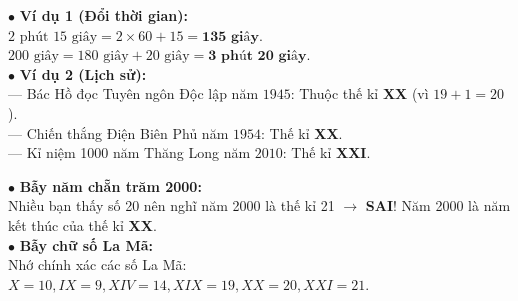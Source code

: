 \documentclass[14pt,a4paper,oneside]{extbook}
\begin{document}
\vspace{2mm}

\noindent
\begin{minipage}[t]{0.53\textwidth}
  \begin{tcolorbox}[
    enhanced,
    title={\footnotesize\bfseries\color{white}\faCheckCircle\ Ví dụ thực hành chuẩn mực},
    colback=green!2!white,
    colframe=green!60!black,
    arc=2.5mm, boxrule=0.8pt, top=1.8mm, bottom=1.8mm, left=2.2mm, right=2.2mm
  ]
    \footnotesize
    $\bullet$ \textbf{Ví dụ 1 (Đổi thời gian):}\\
    $2\text{ phút } 15\text{ giây} = 2 \times 60 + 15 = \mathbf{135\text{ giây}}$.\\
    $200\text{ giây} = 180\text{ giây} + 20\text{ giây} = \mathbf{3\text{ phút } 20\text{ giây}}$.\\
    $\bullet$ \textbf{Ví dụ 2 (Lịch sử):}\\
    --- Bác Hồ đọc Tuyên ngôn Độc lập năm $1945$: Thuộc thế kỉ \textbf{XX} (vì $19 + 1 = 20$).\\
    --- Chiến thắng Điện Biên Phủ năm $1954$: Thế kỉ \textbf{XX}.\\
    --- Kỉ niệm 1000 năm Thăng Long năm $2010$: Thế kỉ \textbf{XXI}.
  \end{tcolorbox}
\end{minipage}%
\hfill
\begin{minipage}[t]{0.45\textwidth}
  \begin{tcolorbox}[
    enhanced,
    title={\footnotesize\bfseries\color{white}\faExclamationTriangle\ Mẹo tránh bẫy trắc nghiệm},
    colback=red!2!white,
    colframe=red!70!black,
    arc=2.5mm, boxrule=0.8pt, top=1.8mm, bottom=1.8mm, left=2.2mm, right=2.2mm
  ]
    \footnotesize
    $\bullet$ \textbf{Bẫy năm chẵn trăm 2000:}\\
    Nhiều bạn thấy số 20 nên nghĩ năm 2000 là thế kỉ 21 $\rightarrow$ \textbf{SAI}! Năm 2000 là năm kết thúc của thế kỉ \textbf{XX}.\\
    $\bullet$ \textbf{Bẫy chữ số La Mã:}\\
    Nhớ chính xác các số La Mã: $X = 10, IX = 9, XIV = 14, XIX = 19, XX = 20, XXI = 21$.
  \end{tcolorbox}
\end{minipage}
\end{document}
